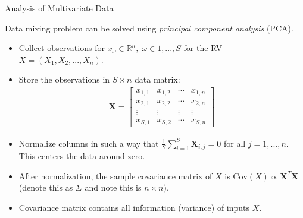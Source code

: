 \documentclass[handout,9pt]{beamer}
\begin{document}
%
\begin{frame}{Analysis of Multivariate Data}

Data mixing problem can be solved using {\em principal component analysis} (PCA). 

\begin{itemize}
\setlength{\itemsep}{10pt}
\item Collect observations for $x_\omega\in \mathbb{R}^n,\; \omega \in 1,...,S$ for the RV $X=(X_1,X_2,...,X_n)$.  
\item Store the observations in $S\times n$ data matrix: 
\begin{align*}
\mathbf{X}=\left[\begin{array}{ccccccc}x_{1,1}&x_{1,2}&\cdots &x_{1,n}\\
x_{2,1}&x_{2,2}&\cdots &x_{2,n}\\
\vdots&\vdots&\vdots &\vdots\\
x_{S,1}&x_{S,2}&\cdots&x_{S,n}
\end{array}
\right]
\end{align*}
\item Normalize columns in such a way that $\frac{1}{S}\sum_{i=1}^S\mathbf{X}_{i,j}=0$ for all $j=1,...,n$.  This centers the data around zero. 
\item After normalization, the sample covariance matrix of $X$ is $\textrm{Cov}(X)\propto \mathbf{X}^T\mathbf{X}$ (denote this as $\Sigma$ and note this is $n\times n$). 
\item Covariance matrix contains all information (variance) of inputs $X$. 


\end{itemize}


\end{frame}
\end{document}
